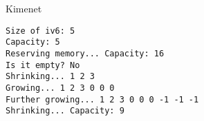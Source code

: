 \begin{frame}
    \begin{exampleblock}{}
        \scriptsize
        
    \end{exampleblock}
\end{frame}

\begin{frame}
    \begin{exampleblock}{}
        
    \end{exampleblock}
\end{frame}

\begin{frame}[fragile]
    \begin{block}{Kimenet}
        \vspace{-.4cm}
        \begin{verbatim}
Size of iv6: 5
Capacity: 5
Reserving memory... Capacity: 16
Is it empty? No
Shrinking... 1 2 3 
Growing... 1 2 3 0 0 0 
Further growing... 1 2 3 0 0 0 -1 -1 -1 
Shrinking... Capacity: 9            
\end{verbatim}
        \vspace{-.3cm}
    \end{block}
\end{frame}

